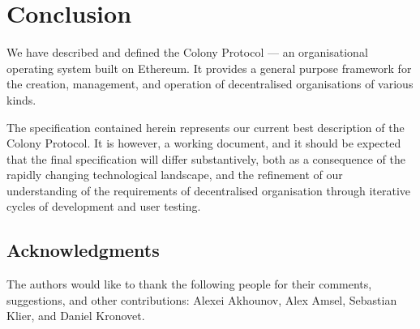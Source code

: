 \section{Conclusion}\label{sec:conclusion}

We have described and defined the Colony Protocol --- an organisational operating system built on Ethereum. It provides a general purpose framework for the creation, management, and operation of decentralised organisations of various kinds.

The specification contained herein represents our current best description of the Colony Protocol. It is however, a working document, and it should be expected that the final specification will differ substantively, both as a consequence of the rapidly changing technological landscape, and the refinement of our understanding of the requirements of decentralised organisation through iterative cycles of development and user testing.

\subsection*{Acknowledgments}


The authors would like to thank the following people for their comments, suggestions, and other contributions: Alexei Akhounov, Alex Amsel, Sebastian Klier, and Daniel Kronovet.
